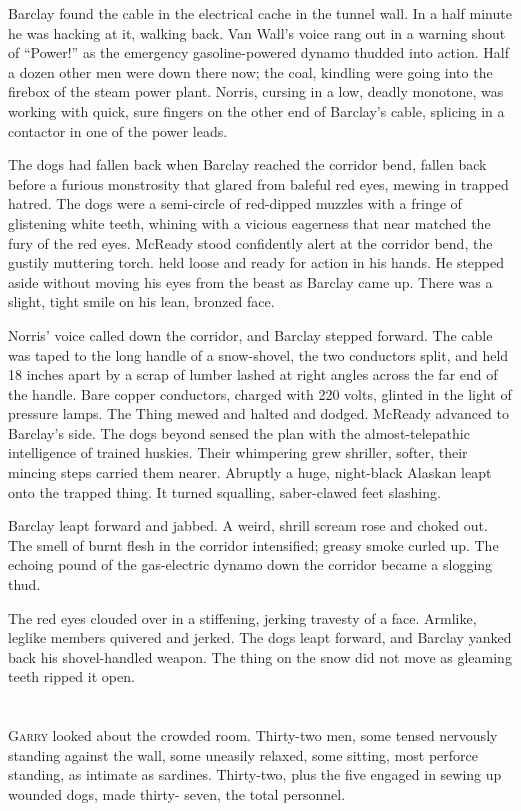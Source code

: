 \documentclass[ebook,oneside,11pt]{memoir}				%
\begin{document}
Barclay found the cable in the electrical cache in the tunnel wall. In a half minute he was hacking at it, walking back. Van Wall's voice rang out in a warning shout of ``Power!'' as the emergency gasoline-powered dynamo thudded into action. Half a dozen other men were down there now; the coal, kindling were going into the firebox of the steam power plant. Norris, cursing in a low, deadly monotone, was working with quick, sure fingers on the other end of Barclay's cable, splicing in a contactor in one of the power leads.

The dogs had fallen back when Barclay reached the corridor bend, fallen back before a furious monstrosity that glared from baleful red eyes, mewing in trapped hatred. The dogs were a semi-circle of red-dipped muzzles with a fringe of glistening white teeth, whining with a vicious eagerness that near matched the fury of the red eyes. McReady stood confidently alert at the corridor bend, the gustily muttering torch. held loose and ready for action in his hands. He stepped aside without moving his eyes from the beast as Barclay came up. There was a slight, tight smile on his lean, bronzed face.

Norris' voice called down the corridor, and Barclay stepped forward. The cable was taped to the long handle of a snow-shovel, the two conductors split, and held 18 inches apart by a scrap of lumber lashed at right angles across the far end of the handle. Bare copper conductors, charged with 220 volts, glinted in the light of pressure lamps. The Thing mewed and halted and dodged. McReady advanced to Barclay's side. The dogs beyond sensed the plan with the almost-telepathic intelligence of trained huskies. Their whimpering grew shriller, softer, their mincing steps carried them nearer. Abruptly a huge, night-black Alaskan leapt onto the trapped thing. It turned squalling, saber-clawed feet slashing.

Barclay leapt forward and jabbed. A weird, shrill scream rose and choked out. The smell of burnt flesh in the corridor intensified; greasy smoke curled up. The echoing pound of the gas-electric dynamo down the corridor became a slogging thud.

The red eyes clouded over in a stiffening, jerking travesty of a face. Armlike, leglike members quivered and jerked. The dogs leapt forward, and Barclay yanked back his shovel-handled weapon. The thing on the snow did not move as gleaming teeth ripped it open. 

\chapter[Chapter 6]{}
\lettrine[lines=3,findent=2pt,nindent=2pt]{G}{arry} looked about the crowded room. Thirty-two men, some tensed nervously standing against the wall, some uneasily relaxed, some sitting, most perforce standing, as intimate as sardines. Thirty-two, plus the five engaged in sewing up wounded dogs, made thirty- seven, the total personnel.
\end{document}
